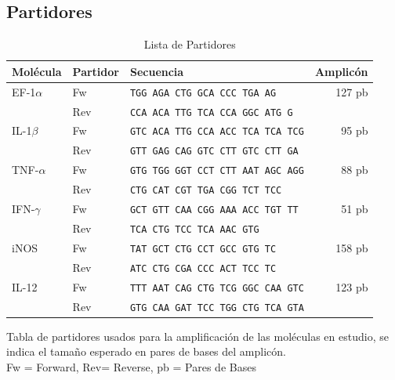 \documentclass[12pt,a4paper,oneside]{scrbook}
\begin{document}
\subsection{Partidores}

\begin{table}[h!]
    \sffamily
    \begin{center}
        \begin{threeparttable}
        \caption{Lista de Partidores}\label{tabla:partidores}
            \begin{tabularx}{15cm}{l l X r}
            \toprule
            \textbf{Molécula} & \textbf{Partidor} & \textbf{Secuencia} & \textbf{Amplicón} \\
            \midrule
            EF-1$\alpha$ & Fw & \texttt{TGG AGA CTG GCA CCC TGA AG} & 127 pb \\
                        & Rev & \texttt{CCA ACA TTG TCA CCA GGC ATG G} & \\
            IL-1$\beta$ & Fw & \texttt{GTC ACA TTG CCA ACC TCA TCA TCG} & 95 pb \\
                        & Rev & \texttt{GTT GAG CAG GTC CTT GTC CTT GA} & \\
            TNF-$\alpha$ & Fw & \texttt{GTG TGG GGT CCT CTT AAT AGC AGG} & 88 pb \\
                        & Rev & \texttt{CTG CAT CGT TGA CGG TCT TCC} & \\
            IFN-$\gamma$    & Fw & \texttt{GCT GTT CAA CGG AAA ACC TGT TT} & 51 pb \\
                        & Rev & \texttt{TCA CTG TCC TCA AAC GTG} & \\
            iNOS    & Fw & \texttt{TAT GCT CTG CCT GCC GTG TC} & 158 pb \\
                    & Rev & \texttt{ATC CTG CGA CCC ACT TCC TC} & \\
            IL-12   & Fw & \texttt{TTT AAT CAG CTG TCG GGC CAA GTC} & 123 pb \\
                    & Rev & \texttt{GTG CAA GAT TCC TGG CTG TCA GTA} &  \\
            \bottomrule
            \end{tabularx}
            \begin{tablenotes}
                \item Tabla de partidores usados para la amplificación de las moléculas en estudio, se indica el tamaño esperado en pares de bases del amplicón. \\ Fw = Forward, Rev= Reverse, pb = Pares de Bases
            \end{tablenotes}
        \end{threeparttable}
    \end{center}
\end{table}
\end{document}
